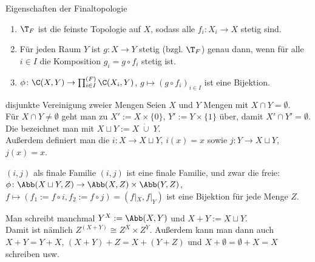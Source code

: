 \begin{Satz}{Eigenschaften der Finaltopologie}
    \begin{enumerate}
        \item
        $\T_F$ ist die feinste Topologie auf $X$, sodass alle
        $f_i\colon X_i \rightarrow X$ stetig sind.

        \item
        Für jeden Raum $Y$ ist $g\colon X \rightarrow Y$ stetig (bzgl. $\T_F$)
        genau dann, wenn für alle $i \in I$ die Komposition
        $g_i = g \circ f_i$ stetig ist.

        \item
        $\phi\colon \C(X, Y) \rightarrow
        \prod_{i \in I}^{(F)} \C(X_i, Y)$, $g \mapsto (g \circ f_i)_{i \in I}$
        ist eine Bijektion.
    \end{enumerate}
\end{Satz}

\linie

\begin{Def}{disjunkte Vereinigung zweier Mengen}
    Seien $X$ und $Y$ Mengen mit $X \cap Y = \emptyset$. \\
    Für $X \cap Y \not= \emptyset$ geht man zu $X' := X \times \{0\}$,
    $Y' := Y \times \{1\}$ über, damit $X' \cap Y' = \emptyset$. \\
    Die  bezeichnet man mit
    $X \sqcup Y := X \;\dot{\cup}\; Y$. \\
    Außerdem definiert man die 
    $i\colon X \rightarrow X \sqcup Y$, $i(x) = x$
    sowie $j\colon Y \rightarrow X \sqcup Y$, $j(x) = x$.
\end{Def}

\begin{Satz}{$(i, j)$ als finale Familie}
    $(i, j)$ ist eine finale Familie, und zwar die freie: \\
    $\phi\colon \Abb(X \sqcup Y, Z) \rightarrow
    \Abb(X, Z) \times \Abb(Y, Z)$,
    $f \mapsto (f_1 := f \circ i, f_2 := f \circ j) = (f|_X, f|_Y)$
    ist eine Bijektion für jede Menge $Z$.
\end{Satz}

\begin{Bem}
    Man schreibt manchmal $Y^X := \Abb(X, Y)$ und $X + Y := X \sqcup Y$. \\
    Damit ist nämlich $Z^{(X + Y)} \cong Z^X \times Z^Y$.
    Außerdem kann man dann auch $X + Y = Y + X$, $(X + Y) + Z = X + (Y + Z)$
    und $X + \emptyset = \emptyset + X = X$ schreiben usw.
\end{Bem}

